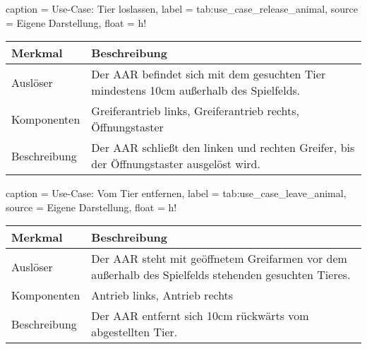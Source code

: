\begin{dhbwtable}{%
    caption	= Use-Case: Tier loslassen,
    label	= tab:use_case_release_animal,
    source	= Eigene Darstellung,
    float = h!
}
    \begin{tabularx}{\textwidth}{lX}
        \toprule
        \textbf{Merkmal}     & \textbf{Beschreibung}  \\\midrule
        Auslöser     & Der \ac{AAR} befindet sich mit dem gesuchten Tier mindestens 10cm außerhalb des Spielfelds.\\
        Komponenten  & Greiferantrieb links, Greiferantrieb rechts, Öffnungstaster\\
        Beschreibung & Der \ac{AAR} schließt den linken und rechten Greifer, bis der Öffnungstaster ausgelöst wird.\\\bottomrule
    \end{tabularx}    
\end{dhbwtable}

\begin{dhbwtable}{%
    caption	= Use-Case: Vom Tier entfernen,
    label	= tab:use_case_leave_animal,
    source	= Eigene Darstellung,
    float = h!
}
    \begin{tabularx}{\textwidth}{lX}
        \toprule
        \textbf{Merkmal}     & \textbf{Beschreibung}  \\\midrule
        Auslöser     & Der \ac{AAR} steht mit geöffnetem Greifarmen vor dem außerhalb des Spielfelds stehenden gesuchten Tieres.\\
        Komponenten  & Antrieb links, Antrieb rechts\\
        Beschreibung & Der \ac{AAR} entfernt sich 10cm rückwärts vom abgestellten Tier.\\\bottomrule
    \end{tabularx}    
\end{dhbwtable}